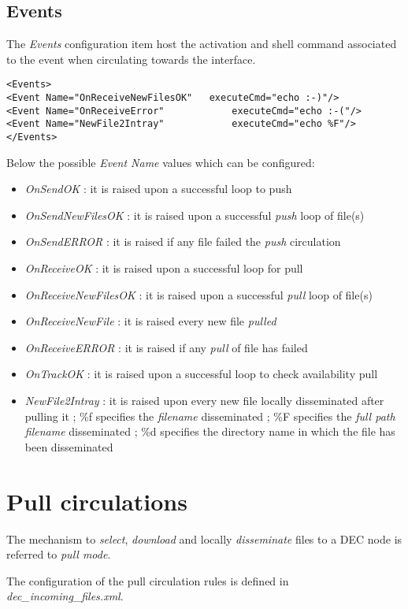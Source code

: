 \documentclass[dec_sum_main.tex]{subfiles}
\begin{document}
\subsection{Events}
\label{Events}
The \textit{Events} configuration item host the activation and shell command associated to the event when circulating towards the interface.
\begin{lstlisting}
<Events>
<Event Name="OnReceiveNewFilesOK"  	executeCmd="echo :-)"/>
<Event Name="OnReceiveError"            executeCmd="echo :-("/>
<Event Name="NewFile2Intray"            executeCmd="echo %F"/>
</Events>
\end{lstlisting}
\par
\par
\noindent
Below the possible \textit{Event Name} values which can be configured:
\begin{itemize}
	\item \textit{OnSendOK} : it is raised upon a successful loop to push
	\item \textit{OnSendNewFilesOK} : it is raised upon a successful \textit{push} loop of file(s)
	\item \textit{OnSendERROR} : it is raised if any file failed the \textit{push} circulation 
	\item \textit{OnReceiveOK} : it is raised upon a successful loop for pull
	\item \textit{OnReceiveNewFilesOK} : it is raised upon a successful \textit{pull} loop of file(s)
	\item \textit{OnReceiveNewFile} : it is raised every new file \textit{pulled}
	\item \textit{OnReceiveERROR} : it is raised if any \textit{pull} of file has failed
	\item \textit{OnTrackOK} : it is raised upon a successful loop to check availability pull
	\item \textit{NewFile2Intray} :	it is raised upon every new file locally disseminated after pulling it ; \%f specifies the \textit{filename} disseminated ; \%F specifies the \textit{full path filename} disseminated ; \%d specifies the directory name in which the file has been disseminated 					 
\end{itemize}

\section{Pull circulations}

The mechanism to \textit{select}, \textit{download} and locally \textit{disseminate} files to a DEC node is referred to \textit{pull mode}.
\par
\noindent
The configuration of the pull circulation rules is defined in \textit{dec\_incoming\_files.xml}.
\end{document}
